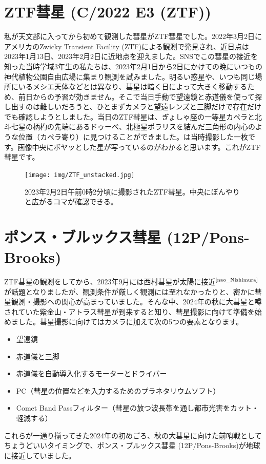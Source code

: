 \documentclass{supernova_pre}
\begin{document}
\section{ZTF彗星 (C/2022 E3 (ZTF))}

私が天文部に入ってから初めて観測した彗星がZTF彗星でした。2022年3月2日にアメリカのZwicky Transient Facility (ZTF)による観測で発見され、近日点は2023年1月13日、2023年2月2日に近地点を迎えました。SNSでこの彗星の接近を知った当時学域3年生の私たちは、2023年2月1日から2日にかけての晩にいつもの神代植物公園自由広場に集まり観測を試みました。明るい惑星や、いつも同じ場所にいるメシエ天体などとは異なり、彗星は暗く日によって大きく移動するため、前日からの予習が効きません。そこで当日手動で望遠鏡と赤道儀を使って探し出すのは難しいだろうと、ひとまずカメラと望遠レンズと三脚だけで存在だけでも確認しようとしました。当日のZTF彗星は、ぎょしゃ座の一等星カペラと北斗七星の柄杓の先端にあるドゥーべ、北極星ポラリスを結んだ三角形の内心のような位置（カペラ寄り）に見つけることができました。は当時撮影した一枚です。画像中央にボヤッとした星が写っているのがわかると思います。これがZTF彗星です。

\begin{figure}
    \centering
    \texttt{[image: img/ZTF\_unstacked.jpg]}
    \caption{2023年2月2日午前0時2分頃に撮影されたZTF彗星。中央にぼんやりと広がるコマが確認できる。}
    \label{fig:ZTF}
\end{figure}


\section{ポンス・ブルックス彗星 (12P/Pons-Brooks)}

ZTF彗星の観測をしてから、2023年9月には西村彗星が太陽に接近$^\text{\cite{nao_Nishimura}}$が話題となりましたが、観測条件が厳しく観測には至れなかったりと、密かに彗星観測・撮影への関心が高まっていました。そんな中、2024年の秋に大彗星と噂されていた紫金山・アトラス彗星が到来すると知り、彗星撮影に向けて準備を始めました。彗星撮影に向けてはカメラに加えて次の5つの要素となります。
\begin{itemize}
    \item 望遠鏡
    \item 赤道儀と三脚
    \item 赤道儀を自動導入化するモーターとドライバー
    \item PC（彗星の位置などを入力するためのプラネタリウムソフト）
    \item Comet Band Passフィルター（彗星の放つ波長帯を通し都市光害をカット・軽減する）
\end{itemize}
これらが一通り揃ってきた2024年の初めごろ、秋の大彗星に向けた前哨戦としてちょうどいいタイミングで、ポンス・ブルックス彗星 (12P/Pons-Brooks)が地球に接近していました。
\end{document}
